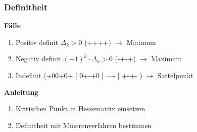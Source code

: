 \subsubsection{Definitheit}
\textbf{Fälle}\\
\begin{enumerate}
    \item Positiv definit $\Delta_k > 0$ (++++) $\rightarrow$ Minimum
    \item Negativ definit $(-1)^k \cdot \Delta_k > 0$ (-+-+) $\rightarrow$ Maximum
    \item Indefinit (+00+0+ | 0+-+0 | ---- | +-+- ) $\rightarrow$ Sattelpunkt
\end{enumerate}

\textbf{Anleitung}\\
\begin{enumerate}
    \item Kritischen Punkt in Hessematrix einsetzen
    \item Definitheit mit Minorenverfahren bestimmen
\end{enumerate}